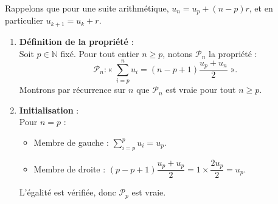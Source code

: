 \documentclass[11pt,a4paper]{article}
\newcommand{\N}{\mathbb{N}}
\begin{document}
\begin{correctionbox}
Rappelons que pour une suite arithmétique, $u_n = u_p + (n-p)r$, et en particulier $u_{k+1} = u_k + r$.

\begin{enumerate}[label=\textbf{\arabic*.}]
    \item \textbf{Définition de la propriété} :\\
    Soit $p \in \N$ fixé. Pour tout entier $n \ge p$, notons $\mathcal{P}_n$ la propriété :
    \[
    \mathcal{P}_n : « \; \sum_{i=p}^n u_i = (n - p + 1) \frac{u_p + u_n}{2} \; ».
    \]
    Montrons par récurrence sur $n$ que $\mathcal{P}_n$ est vraie pour tout $n \ge p$.

    \item \textbf{Initialisation} :\\
    Pour $n = p$ :
    \begin{itemize}
        \item Membre de gauche : $\sum_{i=p}^p u_i = u_p$.
        \item Membre de droite : $(p - p + 1)\dfrac{u_p + u_p}{2} = 1 \times \dfrac{2u_p}{2} = u_p$.
    \end{itemize}
    L'égalité est vérifiée, donc $\mathcal{P}_p$ est vraie.


\end{enumerate}
\end{correctionbox}
\end{document}
